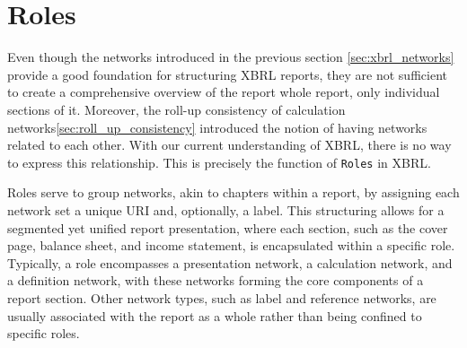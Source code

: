 \label{sec:roles}
\section{Roles}

Even though the networks introduced in the previous section \ref{sec:xbrl_networks} provide a good foundation for structuring XBRL reports, 
they are not sufficient to create a comprehensive overview of the report whole report, only individual sections of it.
Moreover, the roll-up consistency of calculation networks\ref{sec:roll_up_consistency} introduced the notion of having networks related to each other.
With our current understanding of XBRL, there is no way to express this relationship.
This is precisely the function of \texttt{Roles} in XBRL.






Roles serve to group networks, akin to chapters within a report, by assigning each network set a unique URI and, optionally, a label. 
This structuring allows for a segmented yet unified report presentation, where each section, such as the cover page, balance sheet, 
and income statement, is encapsulated within a specific role. 
Typically, a role encompasses a presentation network, a calculation network, and a definition network, 
with these networks forming the core components of a report section. 
Other network types, such as label and reference networks, are usually associated with the report as a whole rather than being confined to specific roles.

